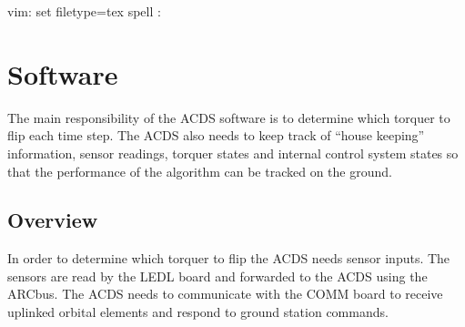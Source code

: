  vim: set filetype=tex spell :

\chapter{Software}
\label{ch:Software}

The main responsibility of the \ac{ACDS} software is to determine which torquer to flip each time step. The \ac{ACDS} also needs to keep track of ``house keeping'' information, sensor readings, torquer states and internal control system states so that the performance of the algorithm can be tracked on the ground. 

\section{Overview}

In order to determine which torquer to flip the \ac{ACDS} needs sensor inputs. The sensors are read by the \ac{LEDL} board and forwarded to the \ac{ACDS} using the \ac{ARC}bus. The \ac{ACDS} needs to communicate with the \ac{COMM} board to receive uplinked orbital elements and respond to ground station commands.

\begin{comment}
\begin{figure}[H]
    \centering
    \begin{tikzpicture}[node distance = 3cm, auto]
        \node [block] (AB) {\acs{ARC}bus interface};
        \node [block,right of=AB] (KF) {Kalman Filter};
        \node [block,above of=KF] (alg) {\acs{ACDS} algorithm};
        \node [block,above of=AB] (CMD) {\acs{ACDS} command parse};
        \node [block,right of=alg] (TQ) {Torquer Control and state tracking};
        \node [block,right of=KF] (HC) {House Keeping};
        \node [point,below of=KF] (DN)  {};

        \path [flow] (KF) -- (alg);
        \path [flow] (AB) -- (CMD);
        \path [flow] (alg) -- (TQ);
        \path [flow] (AB) -- (KF);

        \path [flow] (CMD) -- (KF);
        \path [flow] (CMD) -- (alg);

        \path [flow] (alg) -- (HC);
        \path [flow] (KF) -- (HC);
        \path [flow] (TQ) -- (HC);
        \path [flow] (HC) |- (DN);
        \path [flow] (DN) -| (AB);

    \end{tikzpicture}
    \caption{\acs{ACDS} software overview}
\end{figure}
\end{comment}

